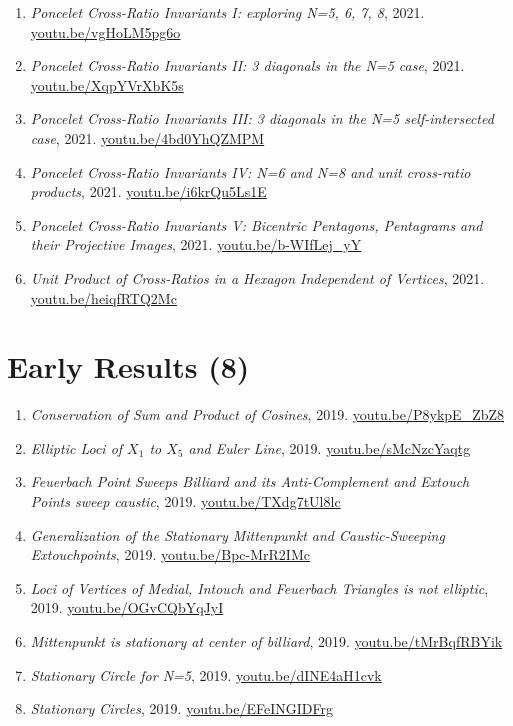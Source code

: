 \documentclass[12pt]{article}
\begin{document}
\begin{enumerate}[resume]
\item \textit{Poncelet Cross-Ratio Invariants I: exploring N=5, 6, 7, 8}, 2021. \href{https://youtu.be/vgHoLM5pg6o}{\url{youtu.be/vgHoLM5pg6o}}
\item \textit{Poncelet Cross-Ratio Invariants II: 3 diagonals in the N=5 case}, 2021. \href{https://youtu.be/XqpYVrXbK5s}{\url{youtu.be/XqpYVrXbK5s}}
\item \textit{Poncelet Cross-Ratio Invariants III: 3 diagonals in the N=5 self-intersected case}, 2021. \href{https://youtu.be/4bd0YhQZMPM}{\url{youtu.be/4bd0YhQZMPM}}
\item \textit{Poncelet Cross-Ratio Invariants IV: N=6 and N=8 and unit cross-ratio products}, 2021. \href{https://youtu.be/i6krQu5Ls1E}{\url{youtu.be/i6krQu5Ls1E}}
\item \textit{Poncelet Cross-Ratio Invariants V: Bicentric Pentagons, Pentagrams and their Projective Images}, 2021. \href{https://youtu.be/b-WIfLej_yY}{\url{youtu.be/b-WIfLej\_yY}}
\item \textit{Unit Product of Cross-Ratios in a Hexagon Independent of Vertices}, 2021. \href{https://youtu.be/heiqfRTQ2Mc}{\url{youtu.be/heiqfRTQ2Mc}}
\end{enumerate}

\section{Early Results (8)}

\begin{enumerate}[resume]
\item \textit{Conservation of Sum and Product of Cosines}, 2019. \href{https://youtu.be/P8ykpE_ZbZ8}{\url{youtu.be/P8ykpE\_ZbZ8}}
\item \textit{Elliptic Loci of $X_{1}$ to $X_{5}$ and Euler Line}, 2019. \href{https://youtu.be/sMcNzcYaqtg}{\url{youtu.be/sMcNzcYaqtg}}
\item \textit{Feuerbach Point Sweeps Billiard and its Anti-Complement and Extouch Points sweep caustic}, 2019. \href{https://youtu.be/TXdg7tUl8lc}{\url{youtu.be/TXdg7tUl8lc}}
\item \textit{Generalization of the Stationary Mittenpunkt and Caustic-Sweeping Extouchpoints}, 2019. \href{https://youtu.be/Bpc-MrR2IMc}{\url{youtu.be/Bpc-MrR2IMc}}
\item \textit{Loci of Vertices of Medial, Intouch and Feuerbach Triangles is not elliptic}, 2019. \href{https://youtu.be/OGvCQbYqJyI}{\url{youtu.be/OGvCQbYqJyI}}
\item \textit{Mittenpunkt is stationary at center of billiard}, 2019. \href{https://youtu.be/tMrBqfRBYik}{\url{youtu.be/tMrBqfRBYik}}
\item \textit{Stationary Circle for N=5}, 2019. \href{https://youtu.be/dINE4aH1cvk}{\url{youtu.be/dINE4aH1cvk}}
\item \textit{Stationary Circles}, 2019. \href{https://youtu.be/EFeINGIDFrg}{\url{youtu.be/EFeINGIDFrg}}
\end{enumerate}
\end{document}
